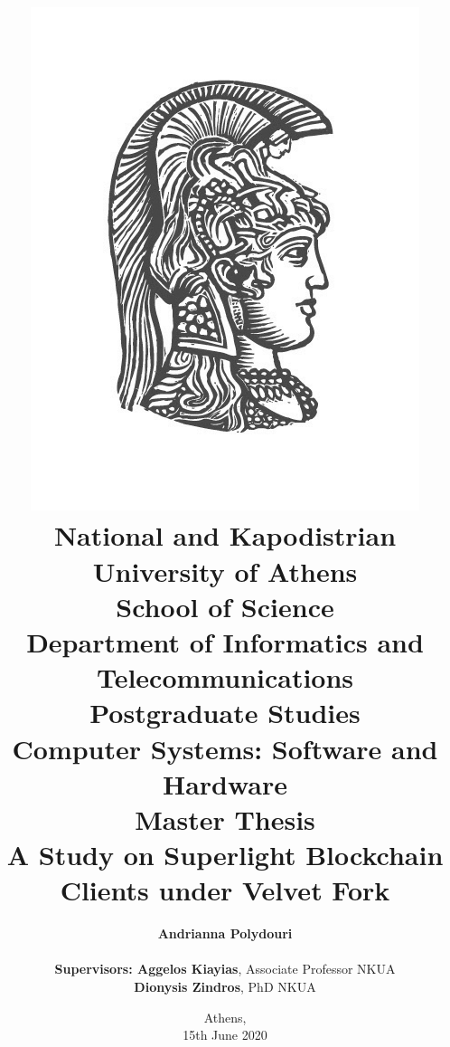 \title{
    {\includegraphics[scale=0.8]{figures/logo_uoa.jpg}}\\
    {\large National and Kapodistrian University of Athens \\
    School of Science \\
    Department of Informatics and Telecommunications}\\
    \vspace{1cm}
    Postgraduate Studies \\
    Computer Systems: Software and Hardware\\
    \vspace{10mm}
    {Master Thesis}\\
    \vspace{3mm}
    {\textbf{\LARGE A Study on Superlight Blockchain Clients under Velvet Fork}}\\
    \vspace{1cm}
    }

\author{
    \textbf{Andrianna Polydouri} \\
    \vspace{1cm} \\
    \textbf{Supervisors: Aggelos Kiayias}, Associate Professor NKUA\\
    \hspace{0.31cm}
    \textbf{Dionysis Zindros}, PhD NKUA
    \vspace{2cm}
}

\date{Athens, \\ 15th June 2020}